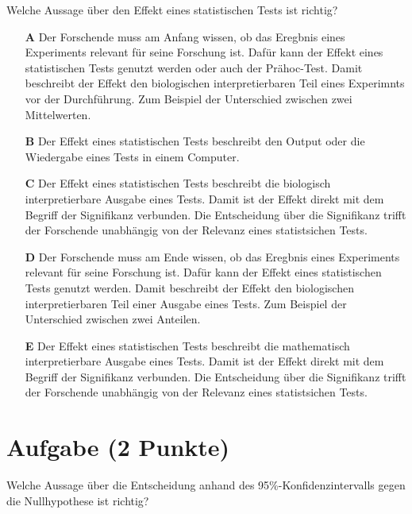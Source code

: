 \documentclass[a4paper, 9pt]{scrartcl}\usepackage[]{graphicx}\usepackage[]{xcolor}
\begin{document}
Welche Aussage über den Effekt eines statistischen Tests ist richtig?



\begin{enumerate}
\item [\textbf{A} \msquare] Der Forschende muss am Anfang wissen, ob das Eregbnis eines Experiments relevant für seine Forschung ist. Dafür kann der Effekt eines statistischen Tests genutzt werden oder auch der Prähoc-Test. Damit beschreibt der Effekt den biologischen interpretierbaren Teil eines Experimnts vor der Durchführung. Zum Beispiel der Unterschied zwischen zwei Mittelwerten.
\item [\textbf{B} \msquare] Der Effekt eines statistischen Tests beschreibt den Output oder die Wiedergabe eines Tests in einem Computer.
\item [\textbf{C} \msquare] Der Effekt eines statistischen Tests beschreibt die biologisch interpretierbare Ausgabe eines Tests. Damit ist der Effekt direkt mit dem Begriff der Signifikanz verbunden. Die Entscheidung über die Signifikanz trifft der Forschende unabhängig von der Relevanz eines statistsichen Tests.
\item [\textbf{D} \msquare] Der Forschende muss am Ende wissen, ob das Eregbnis eines Experiments relevant für seine Forschung ist. Dafür kann der Effekt eines statistischen Tests genutzt werden. Damit beschreibt der Effekt den biologischen interpretierbaren Teil einer Ausgabe eines Tests. Zum Beispiel der Unterschied zwischen zwei Anteilen.
\item [\textbf{E} \msquare] Der Effekt eines statistischen Tests beschreibt die mathematisch interpretierbare Ausgabe eines Tests. Damit ist der Effekt direkt mit dem Begriff der Signifikanz verbunden. Die Entscheidung über die Signifikanz trifft der Forschende unabhängig von der Relevanz eines statistsichen Tests.
\end{enumerate}

\section{Aufgabe \hfill (2 Punkte)}



Welche Aussage über die Entscheidung anhand des 95\%-Konfidenzintervalls gegen die
Nullhypothese ist richtig?
\end{document}
